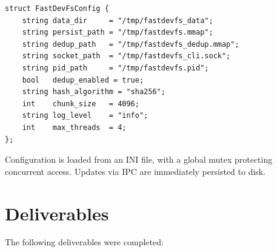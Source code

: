 \documentclass[12pt, a4paper]{article}
\begin{document}
\begin{lstlisting}[caption={Configuration structure with defaults.}]
struct FastDevFsConfig {
    string data_dir     = "/tmp/fastdevfs_data";
    string persist_path = "/tmp/fastdevfs.mmap";
    string dedup_path   = "/tmp/fastdevfs_dedup.mmap";
    string socket_path  = "/tmp/fastdevfs_cli.sock";
    string pid_path     = "/tmp/fastdevfs.pid";
    bool   dedup_enabled = true;
    string hash_algorithm = "sha256";
    int    chunk_size   = 4096;
    string log_level    = "info";
    int    max_threads  = 4;
};
\end{lstlisting}

Configuration is loaded from an INI file, with a global mutex protecting concurrent access. Updates via IPC are immediately persisted to disk.

\section{Deliverables}

The following deliverables were completed:
\end{document}
